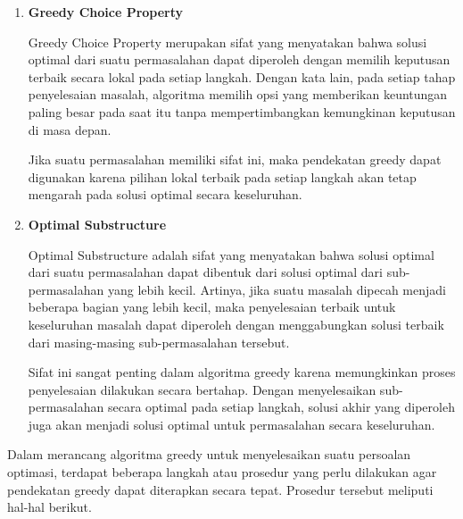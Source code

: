 \documentclass{article}
\begin{document}
\begin{enumerate}[label=\alph*.]

\item \textbf{Greedy Choice Property}

Greedy Choice Property merupakan sifat yang menyatakan bahwa solusi optimal dari suatu permasalahan 
dapat diperoleh dengan memilih keputusan terbaik secara lokal pada setiap langkah. Dengan kata lain, 
pada setiap tahap penyelesaian masalah, algoritma memilih opsi yang memberikan keuntungan paling 
besar pada saat itu tanpa mempertimbangkan kemungkinan keputusan di masa depan.

Jika suatu permasalahan memiliki sifat ini, maka pendekatan greedy dapat digunakan karena 
pilihan lokal terbaik pada setiap langkah akan tetap mengarah pada solusi optimal secara 
keseluruhan.

\item \textbf{Optimal Substructure}

Optimal Substructure adalah sifat yang menyatakan bahwa solusi optimal dari suatu permasalahan dapat 
dibentuk dari solusi optimal dari sub-permasalahan yang lebih kecil. Artinya, jika suatu masalah dipecah 
menjadi beberapa bagian yang lebih kecil, maka penyelesaian terbaik untuk keseluruhan masalah dapat 
diperoleh dengan menggabungkan solusi terbaik dari masing-masing sub-permasalahan tersebut.

Sifat ini sangat penting dalam algoritma greedy karena memungkinkan proses penyelesaian dilakukan 
secara bertahap. Dengan menyelesaikan sub-permasalahan secara optimal pada setiap langkah, solusi 
akhir yang diperoleh juga akan menjadi solusi optimal untuk permasalahan secara keseluruhan.

\end{enumerate}

\vspace{0.4cm}

Dalam merancang algoritma greedy untuk menyelesaikan suatu persoalan optimasi, terdapat beberapa 
langkah atau prosedur yang perlu dilakukan agar pendekatan greedy dapat diterapkan secara tepat. 
Prosedur tersebut meliputi hal-hal berikut.
\end{document}
